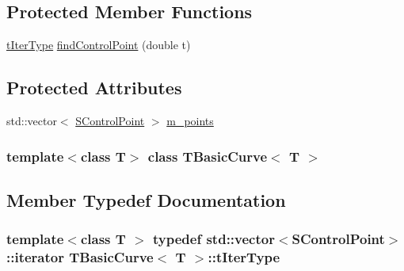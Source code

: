 \subsection*{Protected Member Functions}
\begin{DoxyCompactItemize}
\item 
\hyperlink{classTBasicCurve_a6a1c1b18090f60821279e8b76cff3a5c}{tIterType} \hyperlink{classTBasicCurve_adaeab401aa125173950c43c5b5ebdbe1}{findControlPoint} (double t)
\end{DoxyCompactItemize}
\subsection*{Protected Attributes}
\begin{DoxyCompactItemize}
\item 
std::vector$<$ \hyperlink{structTBasicCurve_1_1SControlPoint}{SControlPoint} $>$ \hyperlink{classTBasicCurve_adcac1bd879cba09e8e0c9b6b6ebc5760}{m\_\-points}
\end{DoxyCompactItemize}
\subsubsection*{template$<$class T$>$ class TBasicCurve$<$ T $>$}



\subsection{Member Typedef Documentation}
\hypertarget{classTBasicCurve_a6a1c1b18090f60821279e8b76cff3a5c}{
\subsubsection[{tIterType}]{\setlength{\rightskip}{0pt plus 5cm}template$<$class T $>$ typedef std::vector$<${\bf SControlPoint}$>$::iterator {\bf TBasicCurve}$<$ T $>$::{\bf tIterType}}}
\label{classTBasicCurve_a6a1c1b18090f60821279e8b76cff3a5c}


